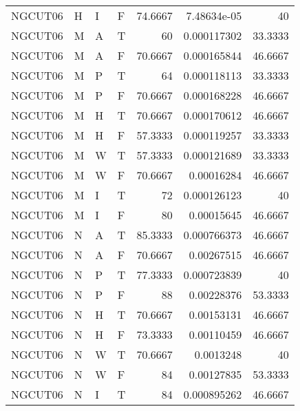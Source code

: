 \begin{longtable}{llllrrr}
    NGCUT06  & H         & I         & F          & 74.6667    & 7.48634e-05 & 40       \\
    NGCUT06  & M         & A         & T          & 60         & 0.000117302 & 33.3333  \\
    NGCUT06  & M         & A         & F          & 70.6667    & 0.000165844 & 46.6667  \\
    NGCUT06  & M         & P         & T          & 64         & 0.000118113 & 33.3333  \\
    NGCUT06  & M         & P         & F          & 70.6667    & 0.000168228 & 46.6667  \\
    NGCUT06  & M         & H         & T          & 70.6667    & 0.000170612 & 46.6667  \\
    NGCUT06  & M         & H         & F          & 57.3333    & 0.000119257 & 33.3333  \\
    NGCUT06  & M         & W         & T          & 57.3333    & 0.000121689 & 33.3333  \\
    NGCUT06  & M         & W         & F          & 70.6667    & 0.00016284  & 46.6667  \\
    NGCUT06  & M         & I         & T          & 72         & 0.000126123 & 40       \\
    NGCUT06  & M         & I         & F          & 80         & 0.00015645  & 46.6667  \\
    NGCUT06  & N         & A         & T          & 85.3333    & 0.000766373 & 46.6667  \\
    NGCUT06  & N         & A         & F          & 70.6667    & 0.00267515  & 46.6667  \\
    NGCUT06  & N         & P         & T          & 77.3333    & 0.000723839 & 40       \\
    NGCUT06  & N         & P         & F          & 88         & 0.00228376  & 53.3333  \\
    NGCUT06  & N         & H         & T          & 70.6667    & 0.00153131  & 46.6667  \\
    NGCUT06  & N         & H         & F          & 73.3333    & 0.00110459  & 46.6667  \\
    NGCUT06  & N         & W         & T          & 70.6667    & 0.0013248   & 40       \\
    NGCUT06  & N         & W         & F          & 84         & 0.00127835  & 53.3333  \\
    NGCUT06  & N         & I         & T          & 84         & 0.000895262 & 46.6667  \\

\end{longtable}
